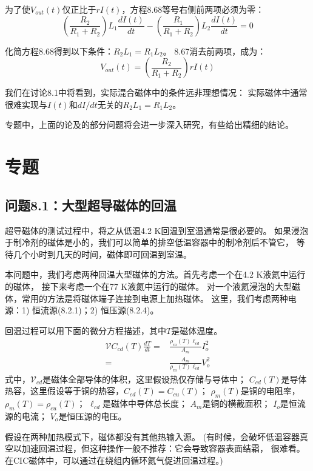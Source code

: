 为了使$V_{out}(t)$仅正比于$rI(t)$，方程8.68等号右侧前两项必须为零：
\begin{equation}%
\left(\frac{R_2}{R_1+R_2}\right)L_1\frac{dI(t)}{dt}-\left(\frac{R_1}{R_1+R_2}\right)L_2\frac{dI(t)}{dt}=0
\end{equation}

化简方程8.68得到以下条件：$R_2L_1=R_1L_2$。
8.67消去前两项，成为：
\begin{equation}%
V_{out}(t)=\left(\frac{R_2}{R_1+R_2}\right)rI(t)
\end{equation}

我们在讨论8.1中将看到，实际混合磁体中的条件远非理想情况：
实际磁体中通常很难实现与$I(t)$和$dI/dt$无关的$R_2L_1=R_1L_2$。

专题中，上面的论及的部分问题将会进一步深入研究，有些给出精细的结论。

\section{专题}

\subsection{问题8.1：大型超导磁体的回温}
超导磁体的测试过程中，将之从低温4.2 K回温到室温通常是很必要的。
如果浸泡于制冷剂的磁体是小的，我们可以简单的排空低温容器中的制冷剂后不管它，
等待几个小时到几天的时间，磁体即可回温到室温。

本问题中，我们考虑两种回温大型磁体的方法。首先考虑一个在4.2 K液氦中运行的磁体，
接下来考虑一个在77 K液氮中运行的磁体。
对一个液氦浸泡的大型磁体，常用的方法是将磁体端子连接到电源上加热磁体。
这里，我们考虑两种电源：1) 恒流源(8.2.1)；2) 恒压源(8.2.4)。

回温过程可以用下面的微分方程描述，其中$T$是磁体温度。
\begin{subequations}
	\begin{align}
\mathcal{V}C_{cd}(T)\frac{dT}{dt}=&\frac{\rho_m(T)\ell_{cd}}{A_m}I_{o}^{2} \\
=&\frac{A_m}{\rho_m(T)\ell_{cd}}V_{o}^{2}
	\end{align}
\end{subequations}
式中，$\mathcal{V}_{cd}$是磁体全部导体的体积，这里假设热仅存储与导体中；
$C_{cd}(T)$是导体热容，这里假设等于铜的热容，$C_{cd}(T)=C_{cu}(T)$；
$\rho_m(T)$是铜的电阻率，$\rho_m(T)=\rho_{cu}(T)$；
$\ell_{cd}$是磁体中导体总长度；
$A_m$是铜的横截面积；
$I_o$是恒流源的电流；
$V_o$是恒压源的电压。

假设在两种加热模式下，磁体都没有其他热输入源。
(有时候，会破坏低温容器真空以加速回温过程，但这种操作一般不推荐：它会导致容器表面结霜，
很难看。在CIC磁体中，可以通过在绕组内循环氦气促进回温过程。)

